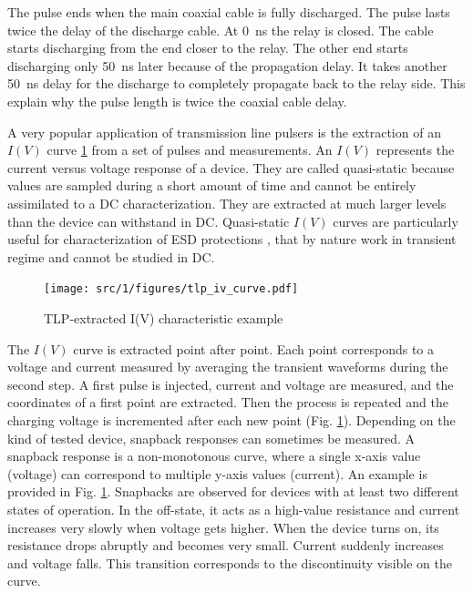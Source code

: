 The pulse ends when the main coaxial cable is fully discharged.
The pulse lasts twice the delay of the discharge cable.
At \SI{0}{\nano\second} the relay is closed.
The cable starts discharging from the end closer to the relay.
The other end starts discharging only \SI{50}{\nano\second} later because of the propagation delay.
It takes another \SI{50}{\nano\second} delay for the discharge to completely propagate back to the relay side.
This explain why the pulse length is twice the coaxial cable delay.

A very popular application of transmission line pulsers is the extraction of an $I(V)$ curve \ref{fig:iv-curve-extraction} from a set of pulses and measurements.
An $I(V)$ represents the current versus voltage response of a device.
They are called quasi-static because values are sampled during a short amount of time and cannot be entirely assimilated to a DC characterization.
They are extracted at much larger levels than the device can withstand in DC.
Quasi-static $I(V)$ curves are particularly useful for characterization of ESD protections \cite{TLPforESDProtectionCz}, that by nature work in transient regime and cannot be studied in DC.

\begin{figure}[!h]
  \centering
  \texttt{[image: src/1/figures/tlp\_iv\_curve.pdf]}
  \caption{TLP-extracted I(V) characteristic example}
  \label{fig:iv-curve-extraction}
\end{figure}

The $I(V)$ curve is extracted point after point.
Each point corresponds to a voltage and current measured by averaging the transient waveforms during the second step.
A first pulse is injected, current and voltage are measured, and the coordinates of a first point are extracted.
Then the process is repeated and the charging voltage is incremented after each new point (Fig. \ref{fig:iv-curve-extraction}).
Depending on the kind of tested device, snapback responses can sometimes be measured.
A snapback response is a non-monotonous curve, where a single x-axis value (voltage) can correspond to multiple y-axis values (current).
An example is provided in Fig. \ref{fig:iv-curve-extraction}.
Snapbacks are observed for devices with at least two different states of operation.
In the off-state, it acts as a high-value resistance and current increases very slowly when voltage gets higher.
When the device turns on, its resistance drops abruptly and becomes very small.
Current suddenly increases and voltage falls.
This transition corresponds to the discontinuity visible on the curve.

